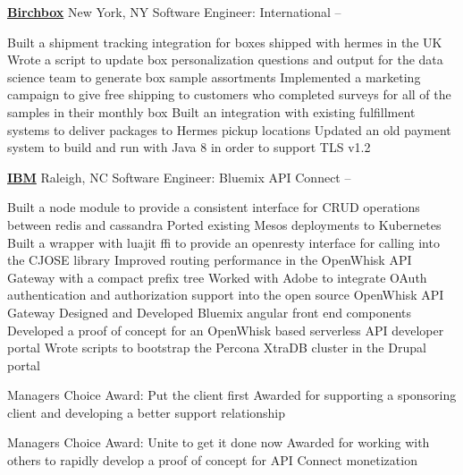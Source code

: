 \documentclass[a4paper,10pt,oneside]{article}
\begin{document}
\begin{body}
\EntryGap{}
\textbf{\href{http://birchbox.com}{Birchbox}} New York, NY
\newline Software Engineer: International\hfill{} -- 
\begin{detail}
\BulletItem Built a shipment tracking integration for boxes shipped with hermes in the UK
\BulletItem Wrote a script to update box personalization questions and output for the data science team to generate box sample assortments
\BulletItem Implemented a marketing campaign to give free shipping to customers who completed surveys for all of the samples in their monthly box
\BulletItem Built an integration with existing fulfillment systems to deliver packages to Hermes pickup locations
\BulletItem Updated an old payment system to build and run with Java 8 in order to support TLS v1.2
\end{detail}
\EntryGap{}
\textbf{\href{https://ibm.com}{IBM} } Raleigh, NC
\newline Software Engineer: Bluemix API Connect \hfill {} -- \DatestampYMD{2017}{10}{[10}
\begin{detail}
\BulletItem Built a node module to provide a consistent interface for CRUD operations between redis and cassandra
\BulletItem Ported existing Mesos deployments to Kubernetes
\BulletItem Built a wrapper with luajit ffi to provide an openresty interface for calling into the CJOSE library
\BulletItem Improved routing performance in the OpenWhisk API Gateway with a compact prefix tree
\BulletItem Worked with Adobe to integrate OAuth authentication and authorization support into the open source OpenWhisk API Gateway
\BulletItem Designed and Developed Bluemix angular front end components
\BulletItem Developed a proof of concept for an OpenWhisk based serverless API developer portal
\BulletItem Wrote scripts to bootstrap the Percona XtraDB cluster in the Drupal portal
\end{detail}
\SmallEntryGap{}
\begin{detail}
Managers Choice Award: Put the client first\hfill{}
\BulletItem Awarded for supporting a sponsoring client and developing a better support relationship
\end{detail}
\SmallEntryGap{}
\begin{detail}
Managers Choice Award: Unite to get it done now\hfill{}
\BulletItem Awarded for working with others to rapidly develop a proof of concept for API Connect monetization
\end{detail} 


\end{body}
\end{document}
